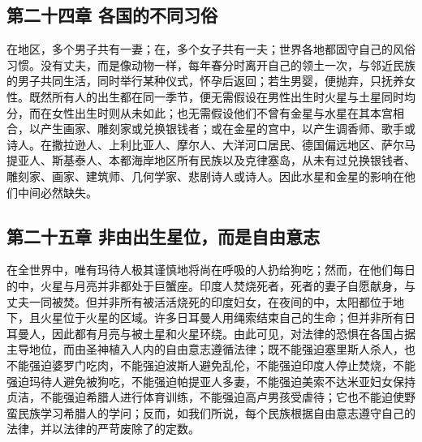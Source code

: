 
\subsection{第二十四章 各国的不同习俗}

在地区，多个男子共有一妻；在，多个女子共有一夫；世界各地都固守自己的风俗习惯。没有丈夫，而是像动物一样，每年春分时离开自己的领土一次，与邻近民族的男子共同生活，同时举行某种仪式，怀孕后返回；若生男婴，便抛弃，只抚养女性。既然所有人的出生都在同一季节，便无需假设在男性出生时火星与土星同时均分，而在女性出生时则从未如此；也无需假设他们不曾有金星与水星在其本宫相合，以产生画家、雕刻家或兑换银钱者；或在金星的宫中，以产生调香师、歌手或诗人。在撒拉逊人、上利比亚人、摩尔人、大洋河口居民、德国偏远地区、萨尔马提亚人、斯基泰人、本都海岸地区所有民族以及克律塞岛，从未有过兑换银钱者、雕刻家、画家、建筑师、几何学家、悲剧诗人或诗人。因此水星和金星的影响在他们中间必然缺失。\par


\subsection{第二十五章 非由出生星位，而是自由意志}

在全世界中，唯有玛待人极其谨慎地将尚在呼吸的人扔给狗吃；然而，在他们每日的中，火星与月亮并非都处于巨蟹座。印度人焚烧死者，死者的妻子自愿献身，与丈夫一同被焚。但并非所有被活活烧死的印度妇女，在夜间的中，太阳都位于地下，且火星位于火星的区域。许多日耳曼人用绳索结束自己的生命；但并非所有日耳曼人，因此都有月亮与被土星和火星环绕。由此可见，对法律的恐惧在各国占据主导地位，而由圣神植入人内的自由意志遵循法律；既不能强迫塞里斯人杀人，也不能强迫婆罗门吃肉，不能强迫波斯人避免乱伦，不能强迫印度人停止焚烧，不能强迫玛待人避免被狗吃，不能强迫帕提亚人多妻，不能强迫美索不达米亚妇女保持贞洁，不能强迫希腊人进行体育训练，不能强迫高卢男孩受虐待；它也不能迫使野蛮民族学习希腊人的学问；反而，如我们所说，每个民族根据自由意志遵守自己的法律，并以法律的严苛废除了的定数。\par


